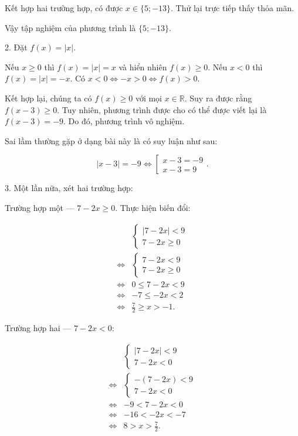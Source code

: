 Kết hợp hai trường hợp, có được $x \in \{5; -13\}$. Thử lại trực tiếp thấy thỏa mãn.

Vậy tập nghiệm của phương trình là $\{5; -13\}$.

2. Đặt $f(x) = |x|$.

Nếu \textcolor{colorEmphasisCyan}{$x \geq 0$} thì $f(x) = |x| = x$ và hiển nhiên $f(x) \geq 0$. Nếu \textcolor{colorEmphasis}{$x < 0$} thì $f(x) = |x| = -x$. Có $x < 0 \iff -x > 0 \iff f(x) > 0$.

Kết hợp lại, chúng ta có $f(x) \geq 0$ với mọi $x \in \mathbb{R}$. Suy ra được rằng $f(x - 3) \geq 0$. Tuy nhiên, phương trình được cho có thể được viết lại là $f(x - 3) = -9$. Do đó, phương trình vô nghiệm.

Sai lầm thường gặp ở dạng bài này là có suy luận như sau:

\begin{equation*}
   |x - 3| = -9 \iff \left[\begin{array}{l}
      x - 3 = -9 \\
      x - 3 = 9
   \end{array}\right..
\end{equation*}

3. Một lần nữa, xét hai trường hợp:

\textcolor{colorEmphasisCyan}{Trường hợp một --- $7 - 2x \geq 0$}. Thực hiện biến đổi:

\begin{align*}
   &\begin{cases}
      |7 - 2x| < 9 \\
      7 - 2x \geq 0
   \end{cases} \\
   \iff &\begin{cases}
      7 - 2x < 9 \\
      7 - 2x \geq 0
   \end{cases} \\
   \iff &0 \leq 7 - 2x < 9 \\
   \iff &-7 \leq -2x < 2 \\
   \iff &\frac{7}{2} \geq x > -1.
\end{align*}

\textcolor{colorEmphasis}{Trường hợp hai --- $7 - 2x < 0$}:

\begin{align*}
   &\begin{cases}
      |7 - 2x| < 9 \\
      7 - 2x < 0
   \end{cases} \\
   \iff &\begin{cases}
      - (7 - 2x) < 9 \\
      7 - 2x < 0
   \end{cases} \\
   \iff & -9 < 7 - 2x < 0 \\
   \iff & -16 < -2x < -7 \\
   \iff & 8 > x > \frac{7}{2}.
\end{align*}

